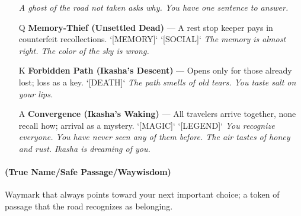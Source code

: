 \begin{enumerate}
  \hfill \textit{A ghost of the road not taken asks why. You have one sentence to answer.}
\item[Q] \textbf{Memory-Thief (Unsettled Dead)} --- A rest stop keeper pays in counterfeit recollections. `[MEMORY]` `[SOCIAL]`
  \hfill \textit{The memory is almost right. The color of the sky is wrong.}
\item[K] \textbf{Forbidden Path (Ikasha's Descent)} --- Opens only for those already lost; loss as a key. `[DEATH]`
  \hfill \textit{The path smells of old tears. You taste salt on your lips.}
\item[A] \textbf{Convergence (Ikasha's Waking)} --- All travelers arrive together, none recall how; arrival as a mystery. `[MAGIC]` `[LEGEND]`
  \hfill \textit{You recognize everyone. You have never seen any of them before. The air tastes of honey and rust. Ikasha is dreaming of you.}
\end{enumerate}

\paragraph*{(True Name/Safe Passage/Waywisdom)} Waymark that always points toward your next important choice; a token of passage that the road recognizes as belonging.

